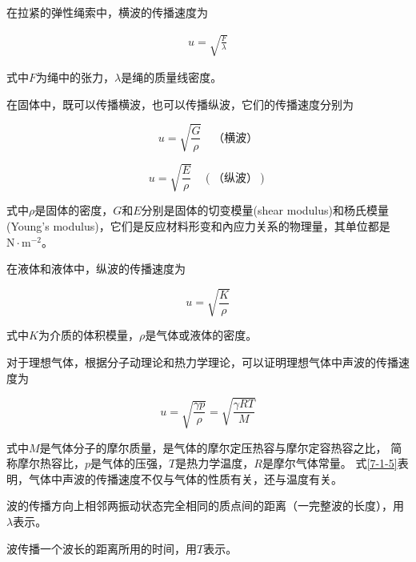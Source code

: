 \documentclass[
	12pt, %
	a4paper, %
]{myLegrandOrangeBook}
\begin{document}
    在拉紧的弹性绳索中，横波的传播速度为

    \begin{align}
        u = \sqrt{\frac{F }{\lambda}}
    \end{align}

    式中\(F \)为绳中的张力，\(\lambda\)是绳的质量线密度。

    在固体中，既可以传播横波，也可以传播纵波，它们的传播速度分别为

    \begin{equation}
        u=\sqrt{\frac{G}{\rho}} \quad \text{（横波）}
    \end{equation}

    \begin{equation}
        u=\sqrt{\frac{E}{\rho}} \quad(\text{（纵波）})
    \end{equation}
    
    式中\(\rho\)是固体的密度，\(G\)和\(E\)分别是固体的切变模量(shear modulus)和杨氏模量
    (Young's modulus)，它们是反应材料形变和內应力关系的物理量，其单位都是\(\mathrm{N \cdot m^{-2}}\)。

    在液体和液体中，纵波的传播速度为

    \begin{equation}
        u=\sqrt{\frac{K}{\rho}}
    \end{equation}

    式中\(K\)为介质的体积模量，\(\rho\)是气体或液体的密度。

    对于理想气体，根据分子动理论和热力学理论，可以证明理想气体中声波的传播速度为

    \begin{equation}
        u=\sqrt{\frac{\gamma p}{\rho}}=\sqrt{\frac{\gamma R T}{M}}
        \label{7-1-5}
    \end{equation}

    式中\(M\)是气体分子的摩尔质量，是气体的摩尔定压热容与摩尔定容热容之比，
    简称摩尔热容比，\(p\)是气体的压强，\(T\)是热力学温度，\(R \)是摩尔气体常量。
    式\ref{7-1-5}表明，气体中声波的传播速度不仅与气体的性质有关，还与温度有关。

    \begin{definition}
    波的传播方向上相邻两振动状态完全相同的质点间的距离（一完整波的长度），用\(\lambda\)表示。
    \end{definition}

    \begin{definition}[周期]
    波传播一个波长的距离所用的时间，用\(T \)表示。
    \end{definition}
\end{document}
